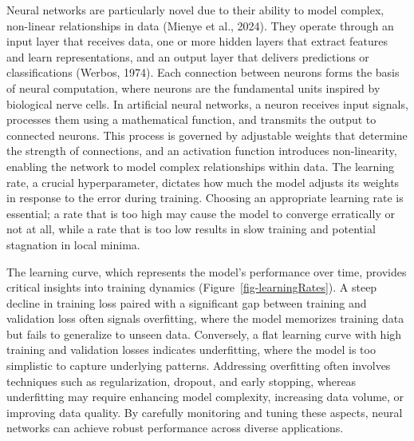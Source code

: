 \documentclass[
  letterpaper,
  11pt,
  english,
  singlespacing,
  headsepline]{MastersDoctoralThesis}
\begin{document}
\begin{spacing}{1.5}
Neural networks are particularly novel due to their ability to model
complex, non-linear relationships in data (Mienye et al., 2024). They
operate through an input layer that receives data, one or more hidden
layers that extract features and learn representations, and an output
layer that delivers predictions or classifications (Werbos, 1974). Each
connection between neurons forms the basis of neural computation, where
neurons are the fundamental units inspired by biological nerve cells. In
artificial neural networks, a neuron receives input signals, processes
them using a mathematical function, and transmits the output to
connected neurons. This process is governed by adjustable weights that
determine the strength of connections, and an activation function
introduces non-linearity, enabling the network to model complex
relationships within data. The learning rate, a crucial hyperparameter,
dictates how much the model adjusts its weights in response to the error
during training. Choosing an appropriate learning rate is essential; a
rate that is too high may cause the model to converge erratically or not
at all, while a rate that is too low results in slow training and
potential stagnation in local minima.

The learning curve, which represents the model's performance over time,
provides critical insights into training dynamics
(Figure~\ref{fig-learningRates}). A steep decline in training loss
paired with a significant gap between training and validation loss often
signals overfitting, where the model memorizes training data but fails
to generalize to unseen data. Conversely, a flat learning curve with
high training and validation losses indicates underfitting, where the
model is too simplistic to capture underlying patterns. Addressing
overfitting often involves techniques such as regularization, dropout,
and early stopping, whereas underfitting may require enhancing model
complexity, increasing data volume, or improving data quality. By
carefully monitoring and tuning these aspects, neural networks can
achieve robust performance across diverse applications.

\begin{figure}

\end{figure}
\end{spacing}
\end{document}
